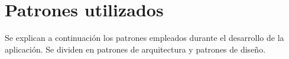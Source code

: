 \section{Patrones utilizados}

Se explican a continuación los patrones empleados durante el desarrollo de la aplicación. Se dividen en patrones de arquitectura y patrones de diseño.








